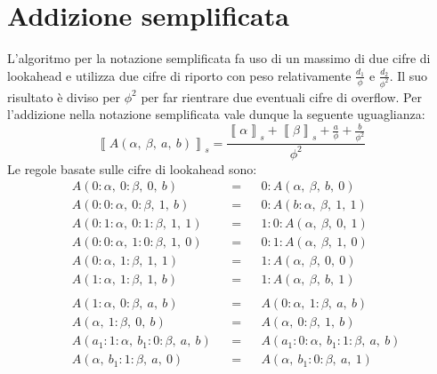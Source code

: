 \documentclass[Lau]{sapthesis}
\begin{document}
\section{Addizione semplificata}
L'algoritmo per la notazione semplificata fa uso di un massimo di due cifre di lookahead e utilizza due cifre di riporto con peso relativamente $\frac{d_1}{\phi}$ e $\frac{d_2}{\phi^2}$. Il suo risultato è diviso per $\phi^2$ per far rientrare due eventuali cifre di overflow. Per l'addizione nella notazione semplificata vale dunque la seguente uguaglianza:
$$\left\llbracket A(\alpha, \ \beta, \ a, \ b) \right\rrbracket_s = 
\frac{\left\llbracket \alpha \right\rrbracket_s + \left\llbracket \beta \right\rrbracket_s + \frac{a}{\phi} + \frac{b}{\phi^2}}{\phi^2}$$
Le regole basate sulle cifre di lookahead sono:
\begin{align*}
&A(0:\alpha, \ 0:\beta, \ 0, \ b) && = && 0:A(\alpha, \ \beta, \ b, \ 0)\\
&A(0:0:\alpha, \ 0:\beta, \ 1, \ b) && = && 0:A(b:\alpha, \ \beta, \ 1, \ 1)\\
&A(0:1:\alpha, \ 0:1:\beta, \ 1, \ 1) && = && 1:0:A(\alpha, \ \beta, \ 0, \ 1)\\
&A(0:0:\alpha, \ 1:0:\beta, \ 1, \ 0) && = && 0:1:A(\alpha, \ \beta, \ 1, \ 0)\\
&A(0:\alpha, \ 1:\beta, \ 1, \ 1) && = && 1:A(\alpha, \ \beta, \ 0, \ 0)\\
&A(1:\alpha, \ 1:\beta, \ 1, \ b) && = && 1:A(\alpha, \ \beta, \ b, \ 1)\\
\\
&A(1:\alpha, \ 0:\beta, \ a, \ b) && = && A(0:\alpha, \ 1:\beta, \ a, \ b)\\
&A(\alpha, \ 1:\beta, \ 0, \ b) && = && A(\alpha, \ 0:\beta, \ 1, \ b)\\
&A(a_1:1:\alpha, \ b_1:0:\beta, \ a, \ b) && = && A(a_1:0:\alpha, \ b_1:1:\beta, \ a, \ b)\\
&A(\alpha, \ b_1:1:\beta, \ a, \ 0) && = && A(\alpha, \ b_1:0:\beta, \ a, \ 1)
\end{align*}
\end{document}

